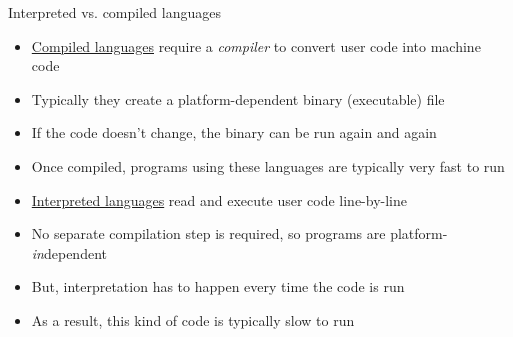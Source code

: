 

\begin{frame}{\insertsectionnumber{ |} Interpreted vs. compiled languages}



\begin{itemize}

\item \underline{Compiled languages} require a \emph{compiler} to convert user code into machine code
\item Typically they create a platform-dependent binary (executable) file
\item If the code doesn't change, the binary can be run again and again
\item Once compiled, programs using these languages are typically very fast to run

\vspace*{1cm}\item \underline{Interpreted languages} read and execute user code line-by-line
\item No separate compilation step is required, so programs are platform-\emph{in}dependent
\item But, interpretation has to happen every time the code is run
\item As a result, this kind of code is typically slow to run

\end{itemize}

\end{frame}




